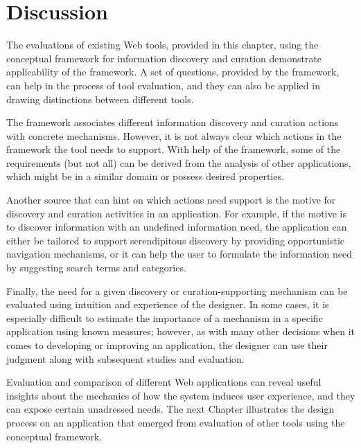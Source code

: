 {\section{Discussion}
The evaluations of existing Web tools, provided in this chapter, using the conceptual framework for information discovery and curation demonstrate applicability of the framework. A set of questions, provided by the framework, can help in the process of tool evaluation, and they can also be applied in drawing distinctions between different tools. 

The framework associates different information discovery and curation actions with concrete mechanisms. However, it is not always clear which actions in the framework the tool needs to support. With help of the framework, some of the requirements (but not all) can be derived from the analysis of other applications, which might be in a similar domain or possess desired properties. 

Another source that can hint on which actions need support is the motive for discovery and curation activities in an application. For example, if the motive is to discover information with an undefined information need, the application  can either be tailored to support serendipitous discovery by providing opportunistic navigation mechanisms, or it can help the user to formulate the information need by suggesting search terms and categories.

Finally, the need for a given discovery or curation-supporting mechanism can be evaluated using intuition and experience of the designer. In some cases, it is especially difficult to estimate the importance of a mechanism in a specific application using known measures; however, as with many other decisions when it comes to developing or improving an application, the designer can use their judgment along with subsequent studies and evaluation. 

Evaluation and comparison of different Web applications can reveal useful insights about the mechanics of how the system induces user experience, and they can expose certain unadressed needs. The next Chapter illustrates the design process on an application that emerged from evaluation of other tools using the conceptual framework. 

} %